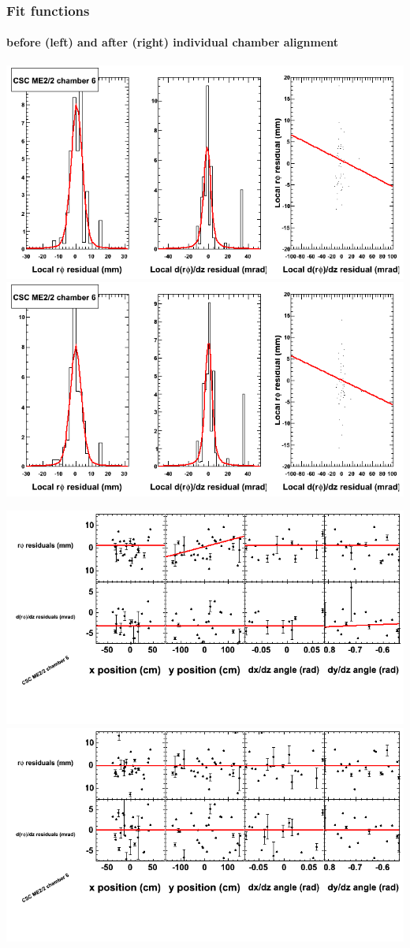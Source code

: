 \documentclass[compress]{beamer}
\begin{document}
\begin{frame}
\frametitle{Fit functions}
\framesubtitle{before (left) and after (right) individual chamber alignment}
\includegraphics[width=0.5\linewidth]{ringfits_3dof/beforefit_MEp22_06_bellcurve.png} \includegraphics[width=0.5\linewidth]{ringfits_3dof/afterfit_MEp22_06_bellcurve.png}

\includegraphics[width=0.5\linewidth]{ringfits_3dof/beforefit_MEp22_06_polynomials.png} \includegraphics[width=0.5\linewidth]{ringfits_3dof/afterfit_MEp22_06_polynomials.png}
\end{frame}
\end{document}
